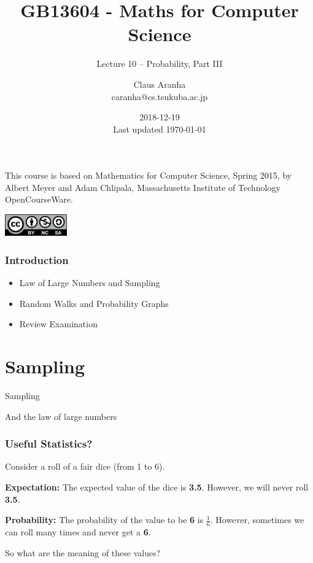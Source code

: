 \documentclass{beamer}
\title[GB13604]{GB13604 - Maths for Computer Science}
\subtitle[]{Lecture 10 -- Probability, Part III}
\author[CC-BY-NC-SA]{Claus Aranha\\{\footnotesize caranha@cs.tsukuba.ac.jp}}
\institute[]{College of Information Science}
\date[2018-12-19]{2018-12-19\\{\tiny Last updated \today}}
\begin{document}
\begin{frame}
  \maketitle

  \begin{center}
    {\smaller This course is based on Mathematics for Computer Science, Spring
    2015, by Albert Meyer and Adam Chlipala, Massachusetts Institute
    of Technology OpenCourseWare.}
    
    \includegraphics[width=0.2\textwidth]{../img/by-nc-sa}
  \end{center}
\end{frame}

\begin{frame}
  \frametitle{Introduction}
  \begin{itemize}
  \item Law of Large Numbers and Sampling
    \bigskip
    
  \item Random Walks and Probability Graphs
    \bigskip
    
  \item Review Examination
  \end{itemize}
\end{frame}


\section{Sampling}
\begin{frame}
  \begin{centering}
    {\huge Sampling}\\
    \bigskip
    
    And the law of large numbers
    
  \end{centering}
\end{frame}

\begin{frame}
  \frametitle{Useful Statistics?}

  Consider a roll of a fair dice (from 1 to 6).

  \bigskip

  {\bf Expectation:} The expected value of the dice is {\bf 3.5}.
  However, we will \alert{never roll {\bf 3.5}}.
  
  \bigskip
  
  {\bf Probability:} The probability of the value to be {\bf 6} is
  $\frac{1}{6}$. However, sometimes we can \alert{roll many times and
    never get a {\bf 6}}.

  \vfill

  So what are the meaning of these values?
\end{frame}
\end{document}
